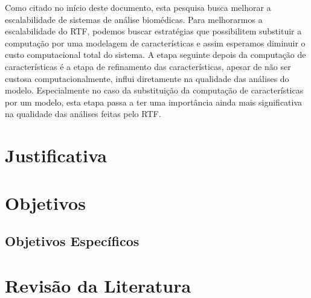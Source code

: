 \documentclass[a4paper,10pt]{article}
\begin{document}
Como citado no início deste documento, esta pesquisa busca melhorar a escalabilidade de sistemas de análise biomédicas. Para melhorarmos a escalabilidade do RTF, podemos buscar estratégias que possibilitem substituir a computação por uma modelagem de características e assim esperamos diminuir o custo computacional total do sistema. A etapa seguinte depois da computação de características é a etapa de refinamento das características, apesar de não ser custosa computacionalmente, influi diretamente na qualidade das análises do modelo. Especialmente no caso da substituição da computação de características por um modelo, esta etapa passa a ter uma importância ainda mais significativa na qualidade das análises feitas pelo RTF.



\section{Justificativa}

\section{Objetivos}

\subsection{Objetivos Específicos}


\section{Revisão da Literatura}
\end{document}
